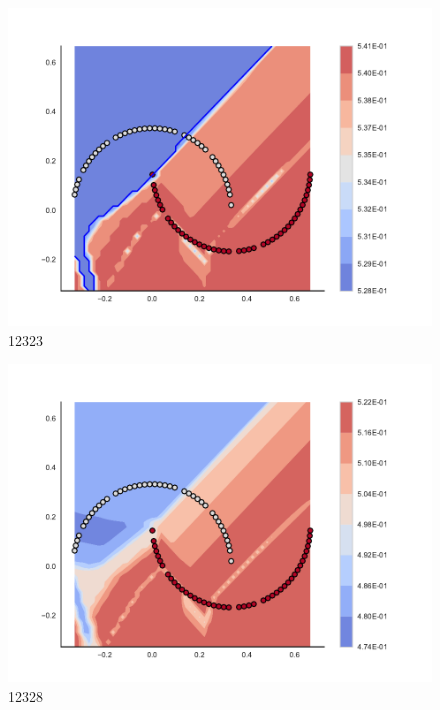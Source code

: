 \begin{subfigure}[b]{0.09\textwidth}
    \includegraphics[clip, trim=2.35cm 1.75cm 4.5cm 0cm,width=\textwidth]{img/convergence/12323.pdf}
    \caption{12323}
    \label{fig:convergence_12323}
\end{subfigure}
%
\begin{subfigure}[b]{0.09\textwidth}
    \includegraphics[clip, trim=2.35cm 1.75cm 4.5cm 0cm,width=\textwidth]{img/convergence/12328.pdf}
    \caption{12328}
    \label{fig:convergence_12328}
\end{subfigure}
%

